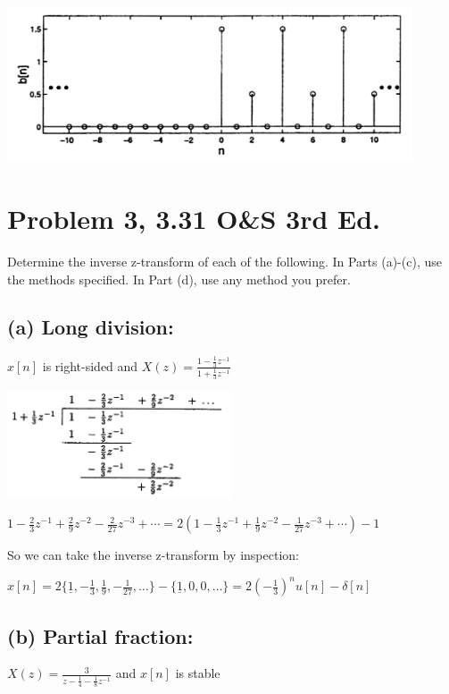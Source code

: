 \documentclass[11pt]{article}
\begin{document}
\includegraphics[width=0.9\textwidth]{Soln4/p2b.png} 

\section*{Problem 3, 3.31 O\&S 3rd Ed.}

Determine the inverse z-transform of each of the following. In Parts (a)-(c), use the methods specified. In Part (d), use any method you prefer.

\subsection*{(a) Long division:}

$x[n]$ is right-sided and $X(z) = \frac{1-\frac{1}{3}z^{-1}}{1+\frac{1}{3}z^{-1}}$

\includegraphics[width=0.5\textwidth]{Soln4/p3_longdivision.png} 

$1-\frac{2}{3}z^{-1}+\frac{2}{9}z^{-2}-\frac{2}{27}z^{-3}+\cdots = 2\left(1-\frac{1}{3}z^{-1}+\frac{1}{9}z^{-2}-\frac{1}{27}z^{-3}+\cdots\right) -1$

So we can take the inverse z-transform by inspection:

$x[n] = 2\{\underline{1},-\frac{1}{3},\frac{1}{9},-\frac{1}{27},\ldots\} - \{\underline{1},0,0,\ldots\} = 2\left(-\frac{1}{3}\right)^n u[n] - \delta[n]$

\subsection*{(b) Partial fraction:}

$X(z) = \frac{3}{z-\frac{1}{4}-\frac{1}{8}z^{-1}}$ and $x[n]$ is stable
\end{document}
